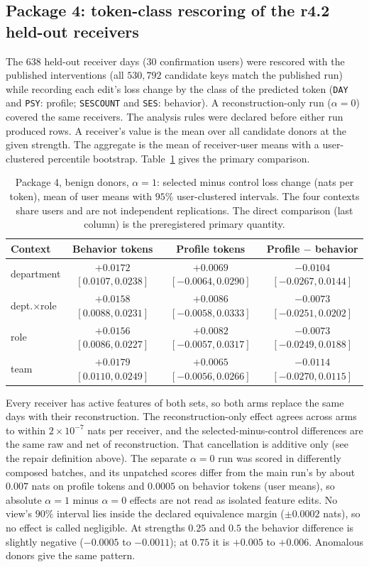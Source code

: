 \subsection{Package 4: token-class rescoring of the r4.2 held-out receivers}
\label{app:pkg4}
The $638$ held-out receiver days ($30$ confirmation users) were rescored
with the published interventions (all $530{,}792$ candidate keys match the
published run) while recording each edit's loss change by the class of the
predicted token (\texttt{DAY} and \texttt{PSY}: profile; \texttt{SESCOUNT}
and \texttt{SES}: behavior). A reconstruction-only run ($\alpha{=}0$) covered
the same receivers. The analysis rules were declared before either run
produced rows. A receiver's value is the mean over all candidate donors at
the given strength. The aggregate is the mean of receiver-user means with a
user-clustered percentile bootstrap. Table~\ref{tab:pkg4} gives the primary
comparison.

\begin{table}[h]
\centering
\small
\caption{Package 4, benign donors, $\alpha{=}1$: selected minus control
loss change (nats per token), mean of user means with $95\%$ user-clustered
intervals. The four contexts share users and are not independent
replications. The direct comparison (last column) is the preregistered
primary quantity.}
\label{tab:pkg4}
\begin{tabular}{lccc}
\toprule
Context & Behavior tokens & Profile tokens & Profile $-$ behavior \\
\midrule
department & $+0.0172$ $[0.0107, 0.0238]$ & $+0.0069$ $[-0.0064, 0.0290]$ & $-0.0104$ $[-0.0267, 0.0144]$ \\
dept.$\times$role & $+0.0158$ $[0.0088, 0.0231]$ & $+0.0086$ $[-0.0058, 0.0333]$ & $-0.0073$ $[-0.0251, 0.0202]$ \\
role & $+0.0156$ $[0.0086, 0.0227]$ & $+0.0082$ $[-0.0057, 0.0317]$ & $-0.0073$ $[-0.0249, 0.0188]$ \\
team & $+0.0179$ $[0.0110, 0.0249]$ & $+0.0065$ $[-0.0056, 0.0266]$ & $-0.0114$ $[-0.0270, 0.0115]$ \\
\bottomrule
\end{tabular}
\end{table}

Every receiver has active features of both sets, so both arms replace the
same days with their reconstruction. The reconstruction-only effect agrees
across arms to within $2\times10^{-7}$ nats per receiver, and the
selected-minus-control differences are the same raw and net of
reconstruction. That cancellation is additive only (see the repair definition above). The
separate $\alpha{=}0$ run was scored in differently composed batches, and its
unpatched scores differ from the main run's by about $0.007$ nats on profile
tokens and $0.0005$ on behavior tokens (user means), so absolute
$\alpha{=}1$ minus $\alpha{=}0$ effects are not read as isolated feature
edits. No view's $90\%$ interval lies inside the declared equivalence margin
($\pm0.0002$ nats), so no effect is called negligible. At strengths $0.25$ and
$0.5$ the behavior difference is slightly negative ($-0.0005$ to $-0.0011$);
at $0.75$ it is $+0.005$ to $+0.006$. Anomalous donors give the same pattern.

